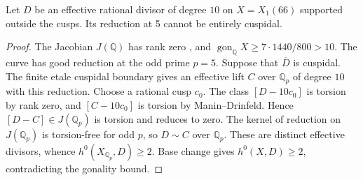 \begin{lemma}
Let $D$ be an effective rational divisor of degree $10$ on
$X=X_1(66)$ supported outside the cusps.
Its reduction at 5 cannot be entirely cuspidal.
\end{lemma}
\begin{proof}
The Jacobian $J(\mathbb Q)$ has rank zero
\cite[Theorem~3.1(2)]{DEHMZ}, and $\operatorname{gon}_{\mathbb Q}X\geq7\cdot1440/800>10$.
The curve has good reduction at the odd prime $p=5$.
Suppose that $\overline D$ is cuspidal. The finite etale cuspidal
boundary gives an effective lift $C$ over $\mathbb Q_p$ of degree
$10$ with this reduction. Choose a rational cusp $c_0$.
The class $[D-10c_0]$ is torsion by rank zero, and
$[C-10c_0]$ is torsion by Manin--Drinfeld. Hence
$[D-C]\in J(\mathbb Q_p)$ is torsion and reduces to zero.
The kernel of reduction on $J(\mathbb Q_p)$ is torsion-free
for odd $p$, so $D\sim C$ over $\mathbb Q_p$.
These are distinct effective divisors, whence
$h^0(X_{\mathbb Q_p},D)\geq2$. Base change gives
$h^0(X,D)\geq2$, contradicting the gonality bound.
\end{proof}
